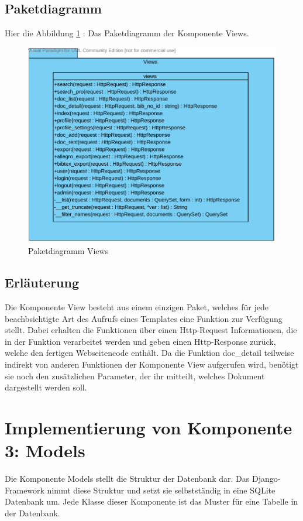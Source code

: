 \subsection{Paketdiagramm}
Hier die Abbildung \ref{fig:PDviews} : Das Paketdiagramm der Komponente Views.
\begin{figure}[H]
\includegraphics[width=0.8\linewidth]{bilder/Paketdiagramm_views.pdf}
\caption{Paketdiagramm Views}
\label{fig:PDviews}
\end{figure}
\subsection{Erl\"auterung}
Die Komponente View besteht aus einem einzigen Paket, welches für jede
beachbsichtigte Art des Aufrufs eines Templates eine Funktion zur Verfügung
stellt. Dabei erhalten die Funktionen über einen Http-Request Informationen, die
in der Funktion verarbeitet werden und geben einen Http-Response zurück, welche
den fertigen Webseitencode enthält. Da die Funktion doc\_detail
teilweise indirekt von anderen Funktionen der Komponente View aufgerufen wird,
benötigt sie noch den zusätzlichen Parameter, der ihr mitteilt, welches Dokument
dargestellt werden soll.


\section{Implementierung von Komponente
         3: Models}


Die Komponente Models stellt die Struktur der Datenbank dar. Das
Django-Framework nimmt diese Struktur und setzt sie selbstständig in eine SQLite Datenbank
um. Jede Klasse dieser Komponente ist das Muster für eine Tabelle in der
Datenbank.


